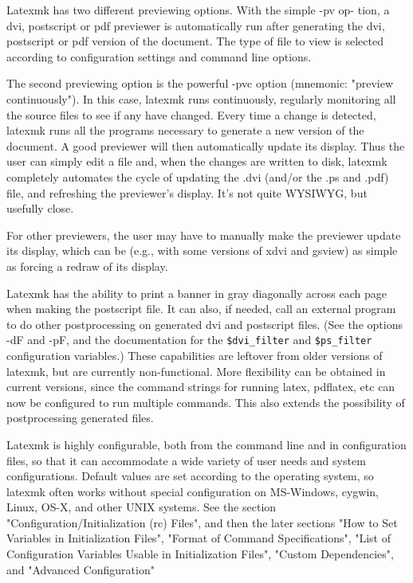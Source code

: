 Latexmk has two different previewing options.  With the simple -pv  op- tion,
a  dvi,  postscript  or pdf previewer is automatically run after generating the
dvi, postscript or pdf version  of  the  document.   The type  of  file  to
view is selected according to configuration settings and command line options.

The second previewing option is the  powerful  -pvc  option  (mnemonic:
"preview continuously").  In this case, latexmk runs continuously, regularly
monitoring all the source files to see if any have changed.  Every  time a
change is detected, latexmk runs all the programs necessary to generate a new
version of the document.  A good previewer will  then automatically update its
display.  Thus the user can simply edit a file and, when the changes are
written to disk, latexmk completely automates the  cycle  of  updating  the
.dvi (and/or the .ps and .pdf) file, and refreshing the previewer's display.
It's not quite WYSIWYG,  but  usefully close.

For  other previewers, the user may have to manually make the previewer
update its display, which can be (e.g., with some versions of xdvi  and
gsview) as simple as forcing a redraw of its display.

Latexmk  has  the  ability  to print a banner in gray diagonally across
each page when making the postscript file.  It  can  also,  if  needed, call
an  external  program to do other postprocessing on generated dvi and
postscript files.  (See the options -dF and -pF, and the documentation  for
the  \verb|$dvi_filter|  and  \verb|$ps_filter|  configuration variables.)
These capabilities are leftover from older versions of latexmk, but are
currently  non-functional.  More flexibility can be obtained in current
versions, since the command strings for running  latex,  pdflatex,  etc can
now be configured to run multiple commands.  This also extends the possibility
of postprocessing generated files.

Latexmk is highly configurable, both from the command line and in
configuration  files,  so  that  it can accommodate a wide variety of user needs
and system configurations.  Default values are set  according  to the operating
system, so latexmk often works without special configuration on MS-Windows,
cygwin, Linux, OS-X, and other UNIX  systems.   See the  section
"Configuration/Initialization  (rc)  Files", and then the later sections "How
to Set Variables in Initialization Files",  "Format of  Command
Specifications", "List of Configuration Variables Usable in Initialization
Files", "Custom Dependencies", and "Advanced  Configuration"

